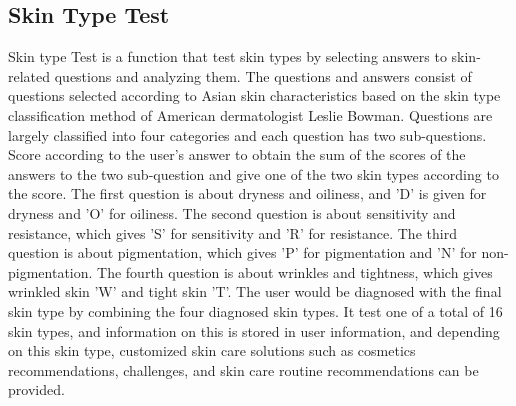 \documentclass[conference]{IEEEtran}
\begin{document}
\subsection{Skin Type Test}
Skin type Test is a function that test skin types by selecting answers to skin-related questions and analyzing them. The questions and answers consist of questions selected according to Asian skin characteristics based on the skin type classification method of American dermatologist Leslie Bowman. Questions are largely classified into four categories and each question has two sub-questions. Score according to the user's answer to obtain the sum of the scores of the answers to the two sub-question and give one of the two skin types according to the score. The first question is about dryness and oiliness, and 'D' is given for dryness and 'O' for oiliness. The second question is about sensitivity and resistance, which gives 'S' for sensitivity and 'R' for resistance. The third question is about pigmentation, which gives 'P' for pigmentation and 'N' for non-pigmentation. The fourth question is about wrinkles and tightness, which gives wrinkled skin 'W' and tight skin 'T'. The user would be diagnosed with the final skin type by combining the four diagnosed skin types. It test one of a total of 16 skin types, and information on this is stored in user information, and depending on this skin type, customized skin care solutions such as cosmetics recommendations, challenges, and skin care routine recommendations can be provided. \\
\end{document}
